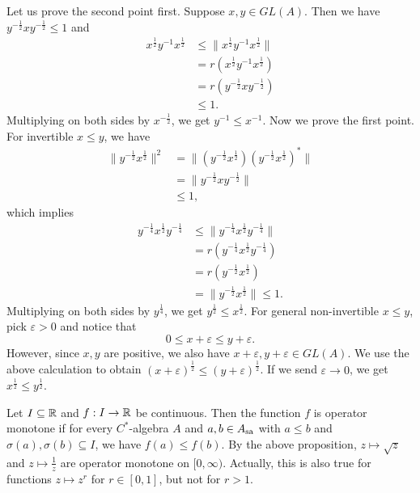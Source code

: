 \begin{myproof}
    Let us prove the second point first. Suppose $x, y \in GL(A)$.
    Then we have $y^{-\frac{1}{2}} x y^{-\frac{1}{2}} \leq 1$ and 
    \begin{align*}
      x^{\frac{1}{2}} y^{-1} x^{\frac{1}{2}} &\leq \| x^{\frac{1}{2}} y^{-1} x^{\frac{1}{2}}\|\\
      &= r(x^{\frac{1}{2}} y^{-1} x^{\frac{1}{2}})\\
      &= r(y^{-\frac{1}{2}} x y^{-\frac{1}{2}})\\
      &\leq 1.
    \end{align*}
    Multiplying on both sides by $x^{-\frac{1}{2}}$, we get $y^{-1} \leq x^{-1}$.
    Now we prove the first point. For invertible $x \leq y$, we have
    \begin{align*}
      \|y^{-\frac{1}{2}} x^{\frac{1}{2}}\|^2 &= \|(y^{-\frac{1}{2}} x^{\frac{1}{2}}) (y^{-\frac{1}{2}} x^{\frac{1}{2}})^*\|\\
      &= \|y^{-\frac{1}{2}} x y^{-\frac{1}{2}}\|\\
      &\leq 1,
    \end{align*}
    which implies
    \begin{align*}
      y^{-\frac{1}{4}} x^{\frac{1}{2}} y^{-\frac{1}{4}} &\leq \|y^{-\frac{1}{4}} x^{\frac{1}{2}} y^{-\frac{1}{4}}\|\\
      &= r(y^{-\frac{1}{4}} x^{\frac{1}{2}} y^{-\frac{1}{4}})\\
      &= r(y^{-\frac{1}{2}} x^{\frac{1}{2}})\\
      &= \| y^{-\frac{1}{2}} x^{\frac{1}{2}} \| \leq 1.
    \end{align*}
    Multiplying on both sides by $y^{\frac{1}{4}}$, we get $y^{\frac{1}{2}} \leq x^{\frac{1}{2}}$.
    For general non-invertible $x \leq y$, pick $\varepsilon > 0$ and notice that 
    $$0 \leq x + \varepsilon \leq y + \varepsilon.$$ However, since $x, y$ are positive, we also have $x + \varepsilon, y + \varepsilon \in GL(A)$.
    We use the above calculation to obtain $(x + \varepsilon)^{\frac{1}{2}} \leq (y + \varepsilon)^{\frac{1}{2}}$. If we send $\varepsilon \to 0$,
    we get $x^{\frac{1}{2}} \leq y^{\frac{1}{2}}$.
\end{myproof}

\begin{remark}
  Let $I \subseteq \mathbb {R}$ and $f: I \to \mathbb {R}$ be continuous. Then the function $f$ is operator monotone 
  if for every $C^*$-algebra $A$ and $a, b \in A_{\operatorname{sa}}$ with $ a \leq b$ and $\sigma(a), \sigma(b) \subseteq I$, we have $f(a) \leq f(b)$.
  By the above proposition, $z \mapsto \sqrt{z}$ and $z \mapsto \frac{1}{z}$ are operator monotone on $[0, \infty)$.
  Actually, this is also true for functions $z \mapsto z^r$ for $r \in [0, 1]$, but not for $r > 1$.
\end{remark}

